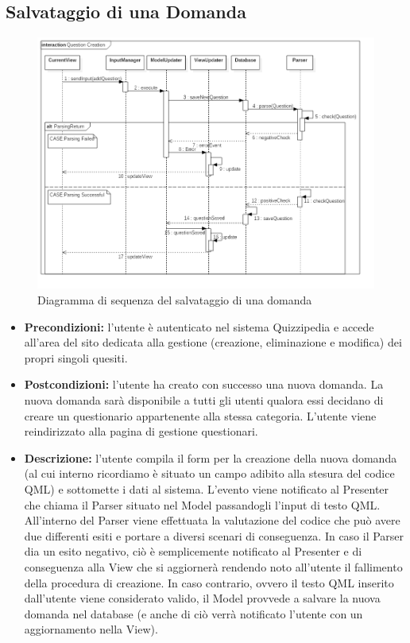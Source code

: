 \rigaregistro{0.0.17}{Luca Alessio (Progettista)}{12/05/2016}{Termine stesura sezione diagrammi e revisione/ampliamento di vari paragrafi}\documentclass[a4paper,11pt]{article}
\begin{document}
	\subsection{Salvataggio di una Domanda}
	\begin{figure}[h!]
	\begin{center}
		\includegraphics[scale=0.5]{../images/QuestionSaving.png}
		\caption{Diagramma di sequenza del salvataggio di una domanda}
	\end{center}
	\end{figure}
	\begin{itemize}
	\item\textbf{Precondizioni:} l'utente è autenticato nel sistema Quizzipedia e accede all'area del sito dedicata alla gestione (creazione, eliminazione e modifica) dei propri singoli quesiti.\\
	\item\textbf{Postcondizioni:} l'utente ha creato con successo una nuova domanda. La nuova domanda sarà disponibile a tutti gli utenti qualora essi decidano di creare un questionario appartenente alla stessa categoria. L'utente viene reindirizzato alla pagina di gestione questionari.\\
	\item\textbf{Descrizione:} l'utente compila il form per la creazione della nuova domanda (al cui interno ricordiamo è situato un campo adibito alla stesura del codice QML) e sottomette i dati al sistema. L'evento viene notificato al Presenter che chiama il Parser situato nel Model passandogli l'input di testo QML. All'interno del Parser viene effettuata la valutazione del codice che può avere due differenti esiti e portare a diversi scenari di conseguenza. In caso il Parser dia un esito negativo, ciò è semplicemente notificato al Presenter e di conseguenza alla View che si aggiornerà rendendo noto all'utente il fallimento della procedura di creazione. In caso contrario, ovvero il testo QML inserito dall'utente viene considerato valido, il Model provvede a salvare la nuova domanda nel database (e anche di ciò verrà notificato l'utente con un aggiornamento nella View).\\
	\end{itemize}
	
\end{document}

